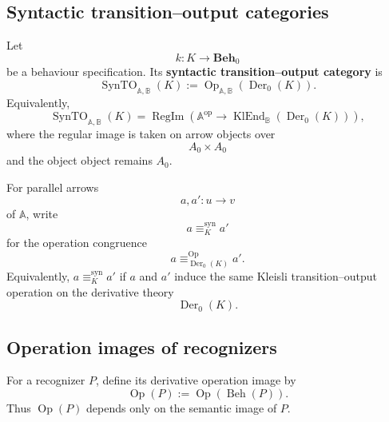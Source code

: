 \subsection{Syntactic transition--output categories}
\label{subsec:syntactic-to-categories}

\begin{definition}
\label{def:syntactic-transition-output-category}
    Let
    \[
        k:K\to\mathbf{Beh}_0
    \]
    be a behaviour specification. Its \textbf{syntactic transition--output
    category} is
    \[
        \operatorname{SynTO}_{\mathbb A,\mathbb B}(K)
        :=
        \operatorname{Op}_{\mathbb A,\mathbb B}(\operatorname{Der}_0(K)).
    \]
    Equivalently,
    \[
        \operatorname{SynTO}_{\mathbb A,\mathbb B}(K)
        =
        \operatorname{RegIm}
        \left(
            \mathbb A^{\mathrm{op}}
            \to
            \operatorname{KlEnd}_{\mathbb B}(\operatorname{Der}_0(K))
        \right),
    \]
    where the regular image is taken on arrow objects over
    \[
        A_0\times A_0
    \]
    and the object object remains \(A_0\).
\end{definition}

\begin{definition}
\label{def:syntactic-operation-congruence}
    For parallel arrows
    \[
        a,a':u\to v
    \]
    of \(\mathbb A\), write
    \[
        a\equiv^{\mathrm{syn}}_K a'
    \]
    for the operation congruence
    \[
        a\equiv^{\operatorname{Op}}_{\operatorname{Der}_0(K)}a'.
    \]
    Equivalently, \(a\equiv^{\mathrm{syn}}_K a'\) if \(a\) and \(a'\) induce
    the same Kleisli transition--output operation on the derivative theory
    \[
        \operatorname{Der}_0(K).
    \]
\end{definition}

\subsection{Operation images of recognizers}
\label{subsec:operation-images-recognizers}

\begin{definition}
\label{def:operation-image-recognizer}
    For a recognizer \(P\), define its derivative operation image by
    \[
        \operatorname{Op}(P)
        :=
        \operatorname{Op}(\operatorname{Beh}(P)).
    \]
    Thus \(\operatorname{Op}(P)\) depends only on the semantic image of \(P\).
\end{definition}

